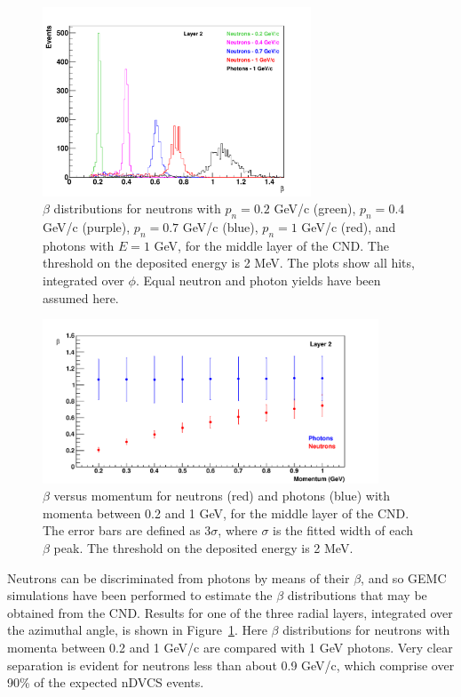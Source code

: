 \begin{figure}
\begin{center}
\includegraphics[width=80mm]{beta_comp_layer_2_II.pdf}
\caption [$\beta$ distributions for neutrons and photons in the CND]
{$\beta$ distributions for neutrons with $p_n=0.2$ GeV/c (green), $p_n=0.4$ GeV/c (purple), $p_n=0.7$ GeV/c (blue), $p_n=1$ GeV/c (red), and photons with $E=1$ GeV, for the middle layer of the CND. 
The threshold on the deposited energy is 2 MeV. The plots show all hits, integrated over $\phi$. Equal neutron and photon yields have been assumed here.}
\label{beta_n_g}
\end{center}
\end{figure}

\begin{figure}
\begin{center}
\includegraphics[width=100mm]{beta_res_n_g_comp_L2.pdf}
\caption [$\beta$ versus momentum for neutrons and photons in the CND]
{$\beta$ versus momentum for neutrons (red) and photons (blue) with momenta between 0.2 and 1 GeV, for the middle layer of the CND. The error bars are defined as $3\sigma$, where $\sigma$ is the fitted width of each $\beta$ peak. The threshold on the deposited energy is 2 MeV.}
\label{fig_beta_res}
\end{center}
\end{figure}

Neutrons can be discriminated from photons by means of their $\beta$, and so GEMC simulations have been performed to estimate the $\beta$ distributions that may be obtained from the CND.  Results for one of the three radial layers, integrated over the azimuthal angle, is shown in Figure~\ref{beta_n_g}.  Here $\beta$ distributions for neutrons with momenta between 0.2 and 1 GeV/c are compared with 1 GeV photons.  Very clear separation is evident for neutrons less than about 0.9 GeV/c, which comprise over 90\% of the expected nDVCS events. 

